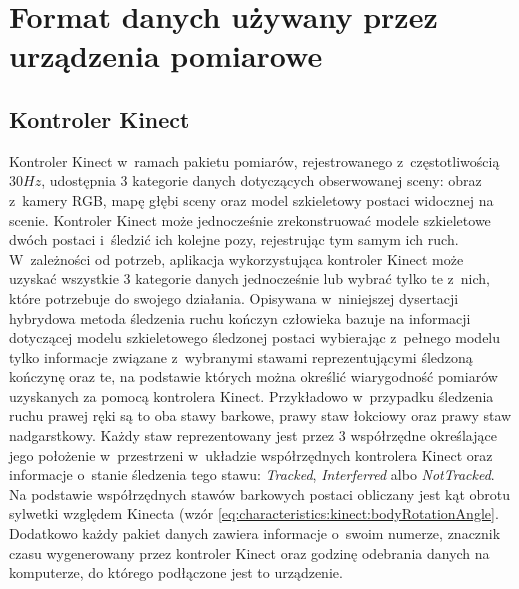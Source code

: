\section{Format danych używany przez urządzenia pomiarowe}
\subsection{Kontroler Kinect}
Kontroler Kinect w~ramach pakietu pomiarów, rejestrowanego z~częstotliwością $30 Hz$, udostępnia 3 kategorie danych dotyczących obserwowanej sceny: obraz z~kamery RGB, mapę głębi sceny oraz model szkieletowy postaci widocznej na scenie. Kontroler Kinect może jednocześnie zrekonstruować modele szkieletowe dwóch postaci i~śledzić ich kolejne pozy, rejestrując tym samym ich ruch. W~zależności od potrzeb, aplikacja wykorzystująca kontroler Kinect może uzyskać wszystkie 3 kategorie danych jednocześnie lub wybrać tylko te z~nich, które potrzebuje do swojego działania. Opisywana w~niniejszej dysertacji hybrydowa metoda śledzenia ruchu kończyn człowieka bazuje na informacji dotyczącej modelu szkieletowego śledzonej postaci wybierając z~pełnego modelu tylko informacje związane z~wybranymi stawami reprezentującymi śledzoną kończynę oraz te, na podstawie których można określić wiarygodność pomiarów uzyskanych za pomocą kontrolera Kinect. 
Przykładowo w~przypadku śledzenia ruchu prawej ręki są to oba stawy barkowe, prawy staw łokciowy oraz prawy staw nadgarstkowy. Każdy staw reprezentowany jest przez 3 współrzędne określające jego położenie w~przestrzeni w~układzie współrzędnych kontrolera Kinect
oraz informacje o~stanie śledzenia tego stawu: \emph{Tracked}, \emph{Interferred} albo \emph{NotTracked}.
Na podstawie współrzędnych stawów barkowych postaci obliczany jest kąt obrotu sylwetki względem Kinecta (wzór \eqref{eq:characteristics:kinect:bodyRotationAngle}. Dodatkowo każdy pakiet danych zawiera informacje o~swoim numerze, znacznik czasu wygenerowany przez kontroler Kinect oraz godzinę odebrania danych na komputerze, do którego podłączone jest to urządzenie.

